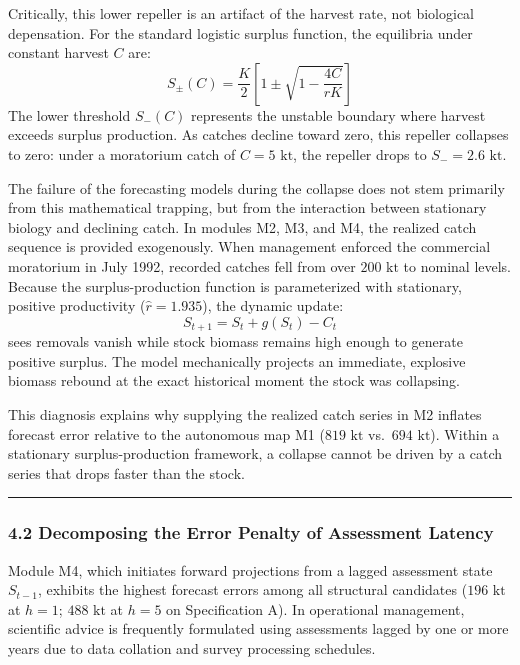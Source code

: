 \documentclass[11pt]{article}
\begin{document}
Critically, this lower repeller is an artifact of the harvest rate, not
biological depensation. For the standard logistic surplus function, the
equilibria under constant harvest \(C\) are:
\[S_\pm(C) = \frac{K}{2} \left[ 1 \pm \sqrt{1 - \frac{4C}{rK}} \right]\]
The lower threshold \(S_-(C)\) represents the unstable boundary where
harvest exceeds surplus production. As catches decline toward zero, this
repeller collapses to zero: under a moratorium catch of
\(C = 5\text{ kt}\), the repeller drops to \(S_- = 2.6\text{ kt}\).

The failure of the forecasting models during the collapse does not stem
primarily from this mathematical trapping, but from the interaction
between stationary biology and declining catch. In modules M2, M3, and
M4, the realized catch sequence is provided exogenously. When management
enforced the commercial moratorium in July 1992, recorded catches fell
from over \(200\text{ kt}\) to nominal levels. Because the
surplus-production function is parameterized with stationary, positive
productivity (\(\hat{r} = 1.935\)), the dynamic update:
\[S_{t+1} = S_t + g(S_t) - C_t\] sees removals vanish while stock
biomass remains high enough to generate positive surplus. The model
mechanically projects an immediate, explosive biomass rebound at the
exact historical moment the stock was collapsing.

This diagnosis explains why supplying the realized catch series in M2
inflates forecast error relative to the autonomous map M1
(\(819\text{ kt}\) vs.~\(694\text{ kt}\)). Within a stationary
surplus-production framework, a collapse cannot be driven by a catch
series that drops faster than the stock.

\begin{center}\rule{0.5\linewidth}{0.5pt}\end{center}

\subsubsection{4.2 Decomposing the Error Penalty of Assessment
Latency}\label{decomposing-the-error-penalty-of-assessment-latency}

Module M4, which initiates forward projections from a lagged assessment
state \(S_{t-1}\), exhibits the highest forecast errors among all
structural candidates (\(196\text{ kt}\) at \(h=1\); \(488\text{ kt}\)
at \(h=5\) on Specification A). In operational management, scientific
advice is frequently formulated using assessments lagged by one or more
years due to data collation and survey processing schedules.
\end{document}

